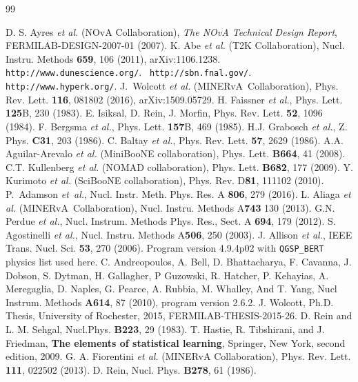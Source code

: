 \documentclass[%
preprint,
 amsmath,amssymb,
 aps,
]{revtex4-1}
\newcommand{\minerva}{\mbox{MINERvA}}
\begin{document}
\begin{thebibliography}{99}

	 D. S. Ayres \textit{et al.} (NOvA Collaboration), \textit{The NOvA Technical Design Report}, FERMILAB-DESIGN-2007-01 (2007).
     K. Abe \textit{et al.} (T2K Collaboration), 
    Nucl. Instru. Methods {\bf 659}, 106 (2011), arXiv:1106.1238.
		 \verb+ http://www.dunescience.org/+.
         \verb+ http://sbn.fnal.gov/+.
         \verb+ http://www.hyperk.org/+.    
         J.~Wolcott \textit{et al.} (\minerva\ Collaboration), Phys. Rev. Lett. {\bf 116}, 081802 (2016), arXiv:1509.05729.
       H. Faissner \textit{et al.}, Phys. Lett. {\bf 125}B, 230 (1983).  
       E. Isiksal, D. Rein, J. Morfin, Phys. Rev. Lett. {\bf 52}, 1096 (1984).
       F. Bergsma \textit{et al.}, Phys. Lett. {\bf 157}B, 469 (1985).  
       H.J. Grabosch \textit{et al.}, Z. Phys. {\bf C31}, 203 (1986).
       C. Baltay \textit{et al.}, Phys. Rev. Lett. {\bf 57}, 2629 (1986).
       A.A. Aguilar-Arevalo \textit{et al.} (MiniBooNE collaboration), Phys. Lett. {\bf B664}, 41 (2008).
       C.T. Kullenberg \textit{et al.} (NOMAD collaboration), Phys. Lett. {\bf B682}, 177 (2009).
       Y. Kurimoto \textit{et al.} (SciBooNE collaboration), Phys. Rev. D{\bf 81}, 111102 (2010).   
       P.~Adamson {\em et~al.}, Nucl. Instr. Meth. Phys. Res. A {\bf 806}, 279 (2016).
       L. Aliaga \textit{et al.} (\minerva\ Collaboration), Nucl. Instru. Methods A{\bf 743} 130 (2013).
       G.N. Perdue \textit{et al.}, Nucl. Instrum. Methods Phys. Res., Sect. A {\bf 694}, 179 (2012).
       S. Agostinelli \textit{et al.}, Nucl. Instru. Methods A{\bf 506}, 250 (2003).
         J. Allison \textit{et al.}, IEEE Trans. Nucl. Sci. {\bf 53}, 270 (2006).  Program version 4.9.4p02 with \verb+QGSP_BERT+ physics list used here.
       C. Andreopoulos, A. Bell, D. Bhattacharya, F. Cavanna, J. Dobson, S. Dytman, H. Gallagher, P Guzowski, R. Hatcher, P. Kehayias, A. Meregaglia,  D. Naples, G. Pearce, A. Rubbia, M. Whalley, And T. Yang, Nucl Instrum. Methods {\bf A614}, 87 (2010), program version 2.6.2. 
       J. Wolcott, Ph.D. Thesis, University of Rochester, 2015, FERMILAB-THESIS-2015-26.
         D. Rein and L. M. Sehgal, Nucl.Phys. {\bf B223}, 29 (1983).
           T. Hastie, R. Tibshirani, and J. Friedman, {\bf The elements of statistical learning}, Springer, New York, second edition, 2009.        
    G. A. Fiorentini \textit{et al.} (MINERvA Collaboration),  Phys. Rev. Lett. {\bf 111}, 022502 (2013).        
    D. Rein, Nucl. Phys. {\bf B278}, 61 (1986).
   
    
\end{thebibliography}
\end{document}
